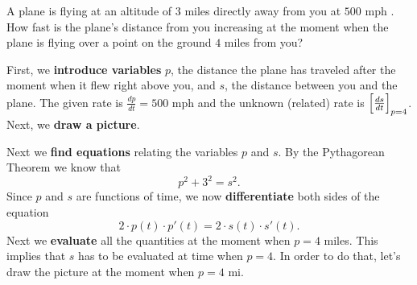 \documentclass{ximera}
\begin{document}
\begin{example}
A plane is flying at an altitude of $3$ miles directly away from you at $500$ mph 
.  How fast is the plane's distance from you increasing at
the moment when the plane is flying over a point on the ground $4$
miles from you?


\begin{explanation}
 First, we \textbf{introduce variables} $p$, the distance the plane has traveled after the moment when it flew right above you, and $s$, the distance between you and the plane. 
The given rate is $\frac{dp}{dt}=500$ mph and the unknown (related) rate is $\Bigl [\frac{ds}{dt}\Bigr]_{p=4}$.
Next, we \textbf{draw a picture}.
\begin{image}
\end{image}
Next we \textbf{find equations} relating the variables $p$ and $s$. By the Pythagorean Theorem
we know that
\[
p^2+3^2=s^2.
\] 
Since  $p$ and $s$ are functions of time, we now
\textbf{differentiate} both sides of the equation 
\[
2\cdot p(t)\cdot p'(t)  = 2\cdot s(t) \cdot s'(t).
\] 
Next  we \textbf{evaluate} all the quantities at the moment when $p=4$ miles. This implies that $s$ has to be evaluated at time when $p=4$. In order to do that,
 let's draw the picture at the moment when $p=4$ mi.
\begin{image}
\end{image}
\end{explanation}
\end{example}
\end{document}
